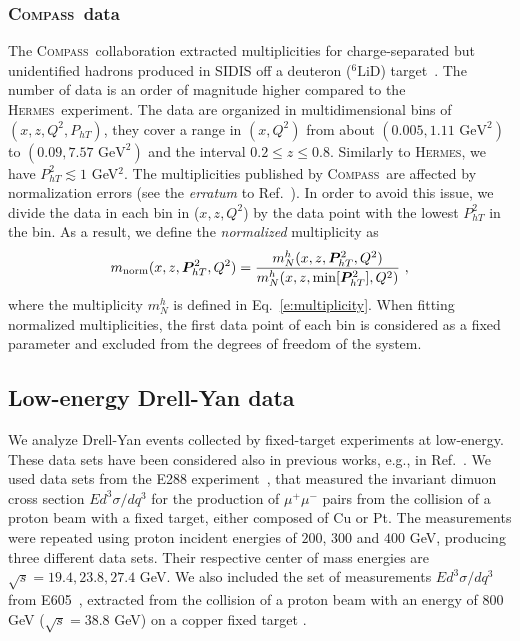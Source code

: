 \documentclass[aps,preprintnumbers,showpacs,nofootinbib,superscriptaddress,floatfix]{revtex4}
\newcommand{\hermes}{\textsc{Hermes}}
\newcommand{\compass}{\textsc{Compass}}
\newcommand{\Tperp}{T}
\begin{document}
\subsubsection{\compass\ data}
\label{sss:compass}

The \compass\ collaboration extracted multiplicities for charge-separated but unidentified hadrons produced in SIDIS off a deuteron ($^6\text{LiD}$) target~\cite{Adolph:2013stb}.  The number of data is an order of magnitude higher compared to the \hermes\ experiment.
The data are organized in multidimensional bins of $(x,z,Q^2,P_{h\Tperp})$, they cover a range in $(x,Q^2)$ from about $(0.005, 1.11\text{ GeV}^2)$ to $(0.09, 7.57\text{ GeV}^2)$ and the interval $0.2 \leq z \leq 0.8$. Similarly to \hermes , we have $P_{h\Tperp}^2 \lesssim 1$ GeV$^2$. 
The multiplicities published by \compass\ are affected by normalization
errors (see the {\em erratum} to Ref.~\cite{Adolph:2013stb}). In order to
avoid this issue, we divide the data in each bin in ($x, z, Q^2$) by the data
point with the lowest $P_{hT}^2$ in the bin. 
As a result, we define the {\em normalized} multiplicity as
\begin{equation}
m_{\text{norm}}(x,z,\bm{P}_{h\Tperp}^2, Q^2) = \frac{m_N^h(x,z,\bm{P}_{h\Tperp}^2, Q^2)}{m_N^h (x,z,{\rm \min}[\bm{P}_{h\Tperp}^2], Q^2)} \ ,
\label{e:mult_norm}
\end{equation}
where the multiplicity $m_N^h$ is defined in Eq.~\eqref{e:multiplicity}. When fitting normalized multiplicities, the first data point of each bin is considered as a fixed parameter and excluded from the degrees of freedom of the system.

\subsection{Low-energy Drell-Yan data}
\label{ss:dy}

We analyze Drell-Yan events collected by fixed-target experiments at
low-energy. These data sets have been considered also in previous works, e.g.,
in Ref.~\cite{Landry:1999an,Landry:2002ix,Konychev:2005iy,DAlesio:2014mrz}. 
We used data sets from the E288 experiment~\cite{Ito:1980ev}, that measured the invariant dimuon cross section $E d^3\sigma / dq^3$ for the production of $\mu^+ \mu^-$ pairs from the collision of a proton beam with a fixed target, either composed of Cu or Pt.
The measurements were repeated using proton incident energies of $200$, $300$ and $400$ GeV, producing three different data sets.
Their respective center of mass energies are $\sqrt{s}=19.4,23.8,27.4$ GeV.
We also included the set of measurements $E d^3\sigma / dq^3$ from E605~\cite{Moreno:1990sf}, extracted from the collision of a proton beam with an energy of $800$ GeV ($\sqrt{s}=38.8$ GeV) on a copper fixed target .
\end{document}
